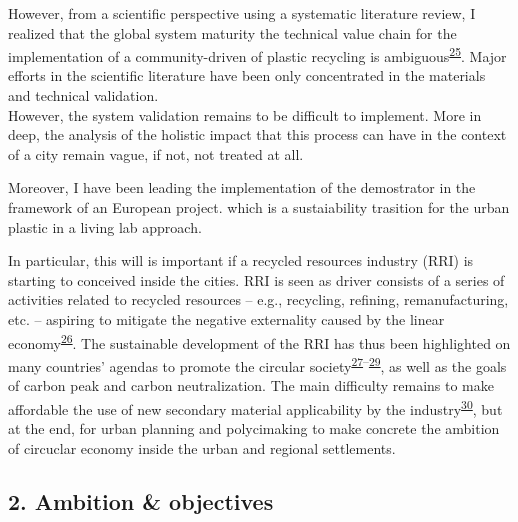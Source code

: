 \documentclass[
  11pt,
  a4paperpaper,
  onecolumn]{article}
\begin{document}
However, from a scientific perspective using a systematic literature
review, I realized that the global system maturity the technical value
chain for the implementation of a community-driven of plastic recycling
is
ambiguous\textsuperscript{\protect\hyperlink{ref-CruzSanchez2020}{25}}.
Major efforts in the scientific literature have been only concentrated
in the materials and technical validation.\\
However, the system validation remains to be difficult to implement.
More in deep, the analysis of the holistic impact that this process can
have in the context of a city remain vague, if not, not treated at all.

Moreover, I have been leading the implementation of the demostrator in
the framework of an European project. which is a sustaiability trasition
for the urban plastic in a living lab approach.

In particular, this will is important if a recycled resources industry
(RRI) is starting to conceived inside the cities. RRI is seen as driver
consists of a series of activities related to recycled resources --
e.g., recycling, refining, remanufacturing, etc. -- aspiring to mitigate
the negative externality caused by the linear
economy\textsuperscript{\protect\hyperlink{ref-wang2019b}{26}}. The
sustainable development of the RRI has thus been highlighted on many
countries' agendas to promote the circular
society\textsuperscript{\protect\hyperlink{ref-leipold2021}{27}--\protect\hyperlink{ref-jaeger-erben2021a}{29}},
as well as the goals of carbon peak and carbon neutralization. The main
difficulty remains to make affordable the use of new secondary material
applicability by the
industry\textsuperscript{\protect\hyperlink{ref-klotz2022}{30}}, but at
the end, for urban planning and polycimaking to make concrete the
ambition of circuclar economy inside the urban and regional settlements.

\hypertarget{ambition-objectives}{%
\subsection{2. Ambition \& objectives}\label{ambition-objectives}}
\end{document}
